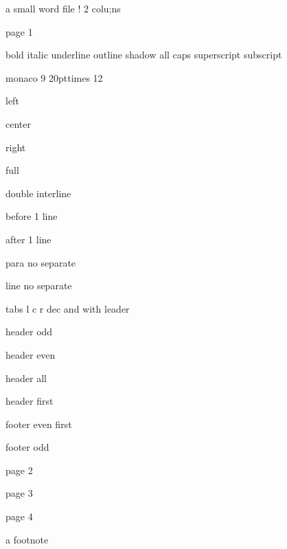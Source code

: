 \documentclass[11pt,a4paper]{article}
\begin{document}
a small word file ! 2 colu;ns

page 1

bold italic underline outline shadow all caps superscript subscript

monaco 9 20pttimes 12

left

center

right

full

double interline

before 1 line

after 1 line

para no separate

line no separate

tabs l c r dec and with leader

header odd

header even

header all

header first

footer even first

footer odd

page 2

page 3

page 4

a footnote
\end{document}
